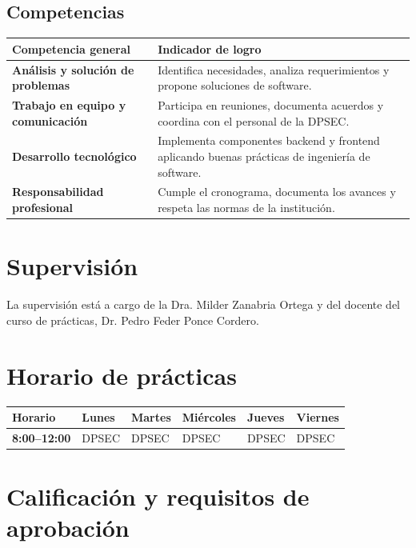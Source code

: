 \documentclass[12pt,a4paper]{article}
\begin{document}
\subsection{Competencias}
\begin{tabularx}{\textwidth}{>{\bfseries}Y Y}
\toprule
Competencia general & Indicador de logro\\
\midrule
Análisis y solución de problemas & Identifica necesidades, analiza requerimientos y propone soluciones de software.\\
Trabajo en equipo y comunicación & Participa en reuniones, documenta acuerdos y coordina con el personal de la DPSEC.\\
Desarrollo tecnológico & Implementa componentes backend y frontend aplicando buenas prácticas de ingeniería de software.\\
Responsabilidad profesional & Cumple el cronograma, documenta los avances y respeta las normas de la institución.\\
\bottomrule
\end{tabularx}

\section{Supervisión}
La supervisión está a cargo de la Dra. Milder Zanabria Ortega y del docente del curso de prácticas, Dr. Pedro Feder Ponce Cordero.

\section{Horario de prácticas}
\begin{center}
\begin{tabular}{>{\bfseries}p{3cm}*{5}{>{\centering\arraybackslash}p{2cm}}}
\toprule
Horario & Lunes & Martes & Miércoles & Jueves & Viernes\\
\midrule
8:00--12:00 & DPSEC & DPSEC & DPSEC & DPSEC & DPSEC\\
\bottomrule
\end{tabular}
\end{center}

\section{Calificación y requisitos de aprobación}
\end{document}
